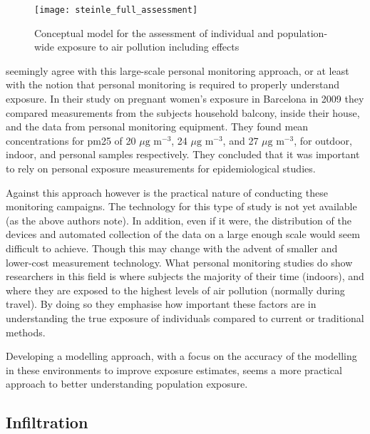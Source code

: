 \begin{figure}[H]
\centering
\texttt{[image: steinle\_full\_assessment]}
\caption{Conceptual model for the assessment of individual and population-wide exposure to air pollution including effects}
\label{fig:steinle_full_assessment}
\end{figure}

\cite{Minguillon2012} seemingly agree with this large-scale personal monitoring approach, or at least with the notion that personal monitoring is required to properly understand exposure. In their study on pregnant women's exposure in Barcelona in 2009 they compared measurements from the subjects household balcony, inside their house, and the data from personal monitoring equipment. They found mean concentrations for \gls{pm25} of 20 $\mu \text{g m}^{-3}$, 24 $\mu \text{g m}^{-3}$, and 27 $\mu \text{g m}^{-3}$, for outdoor, indoor, and personal samples respectively. They concluded that it was important to rely on personal exposure measurements for epidemiological studies.

Against this approach however is the practical nature of conducting these monitoring campaigns. The technology for this type of study is not yet available (as the above authors note). In addition, even if it were, the distribution of the devices and automated collection of the data on a large enough scale would seem difficult to achieve. Though this may change with the advent of smaller and lower-cost measurement technology. What personal monitoring studies do show researchers in this field is where subjects the majority of their time (indoors), and where they are exposed to the highest levels of air pollution (normally during travel). By doing so they emphasise how important these factors are in understanding the true exposure of individuals compared to current or traditional methods.

Developing a modelling approach, with a focus on the accuracy of the modelling in these environments to improve exposure estimates, seems a more practical approach to better understanding population exposure.


\subsection{Infiltration}
\label{sec:infiltration}

